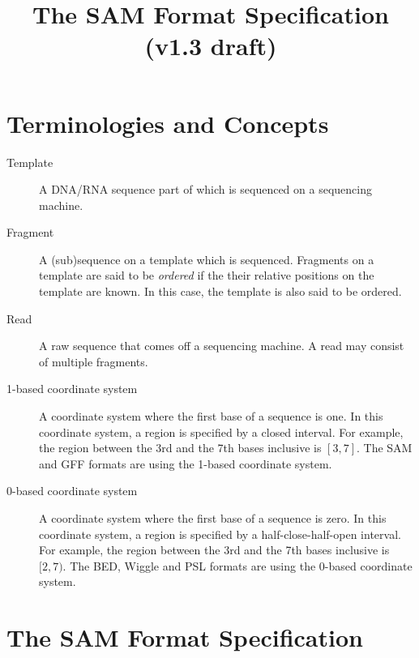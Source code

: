 \documentclass[10pt]{article}
\title{The SAM Format Specification (v1.3 draft)}
\begin{document}
\maketitle

\section{Terminologies and Concepts}

\begin{description}
\item[Template] A DNA/RNA sequence part of which is sequenced on a
  sequencing machine.
\item[Fragment] A (sub)sequence on a template which is
  sequenced. Fragments on a template are said to be \emph{ordered} if
  the their relative positions on the template are known. In this case,
  the template is also said to be ordered.
\item[Read] A raw sequence that comes off a sequencing machine. A read
  may consist of multiple fragments.
\item[1-based coordinate system] A coordinate system where the first
  base of a sequence is one. In this coordinate system, a region is
  specified by a closed interval. For example, the region between the 3rd
  and the 7th bases inclusive is $[3,7]$. The SAM and GFF formats are
  using the 1-based coordinate system.
\item[0-based coordinate system] A coordinate system where the first
  base of a sequence is zero. In this coordinate system, a region is
  specified by a half-close-half-open interval. For example, the region
  between the 3rd and the 7th bases inclusive is $[2,7)$. The BED,
  Wiggle and PSL formats are using the 0-based coordinate system.
\end{description}

\section{The SAM Format Specification}
\end{document}
